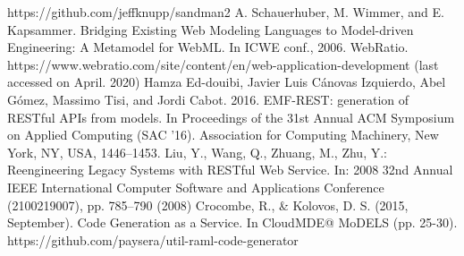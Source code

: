 \documentclass[letterpaper, 10 pt, conference]{ieeeconf}
\begin{document}
\begin{thebibliography}{99}
 https://github.com/jeffknupp/sandman2
 A. Schauerhuber, M. Wimmer, and E. Kapsammer. Bridging Existing Web Modeling Languages to Model-driven Engineering: A Metamodel for WebML. In ICWE conf., 2006.
 WebRatio. https://www.webratio.com/site/content/en/web-application-development (last accessed on April. 2020)
 Hamza Ed-douibi, Javier Luis Cánovas Izquierdo, Abel Gómez, Massimo Tisi, and Jordi Cabot. 2016. EMF-REST: generation of RESTful APIs from models. In Proceedings of the 31st Annual ACM Symposium on Applied Computing (SAC ’16). Association for Computing Machinery, New York, NY, USA, 1446–1453.
 Liu, Y., Wang, Q., Zhuang, M., Zhu, Y.: Reengineering Legacy Systems with RESTful Web Service. In: 2008 32nd Annual IEEE International Computer Software and Applications Conference (2100219007), pp. 785–790 (2008)
 Crocombe, R., & Kolovos, D. S. (2015, September). Code Generation as a Service. In CloudMDE@ MoDELS (pp. 25-30).
 https://github.com/paysera/util-raml-code-generator
\end{thebibliography}
 
\end{document}
